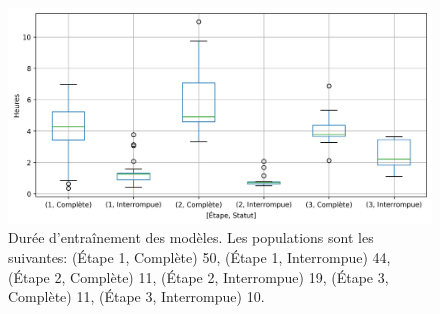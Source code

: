 \begin{figure}[ht]
    \centering
    \includegraphics[width=\textwidth]{results/lemmatisation/entrainement/TrainingDuration96BoxPlot.png}
    \caption{Durée d'entraînement des modèles. Les populations sont les suivantes: (Étape 1, Complète) 50, (Étape 1, Interrompue) 44, (Étape 2, Complète) 11, (Étape 2, Interrompue) 19, (Étape 3, Complète) 11, (Étape 3, Interrompue) 10.}
    \label{fig:lemmatisationTrainingTime}
\end{figure}


